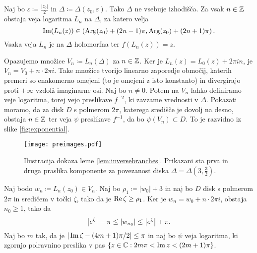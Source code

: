 \begin{dokaz}
    Naj bo \(\varepsilon \coloneq \frac{|z_0|}{2}\) in \(\Delta \coloneq \Delta (z_0, \varepsilon)\). Tako \(\Delta\) ne vsebuje izhodišča. Za vsak \(n \in \mathbb Z\) obstaja veja logaritma \(L_n\) na \(\Delta\), za katero velja
    \[\operatorname{Im} (L_n (z)) \in \left( \operatorname{Arg} (z_0) + (2 n - 1) \pi, \operatorname{Arg} (z_0) + (2 n + 1) \pi \right).\]
    Vsaka veja \(L_n\) je na \(\Delta\) holomorfna ter \(f (L_n (z)) = z\).

    Opazujemo množice \(V_n \coloneq L_n (\Delta)\) za \(n \in \mathbb Z\). Ker je \(L_n (z) = L_0 (z) + 2 \pi i n\), je \(V_n = V_0 + n \cdot 2 \pi i\). Take množice tvorijo linearno zaporedje območij, katerih premeri so enakomerno omejeni (to je omejeni z isto konstanto) in divergirajo proti \(\pm \infty\) vzdolž imaginarne osi. Naj bo \(n \neq 0\). Potem na \(V_n\) lahko definiramo veje logaritma, torej vejo preslikave \(f^{-2}\), ki zavzame vrednosti v \(\Delta\). Pokazati moramo, da za disk \(D\) s polmerom \(2 \pi\), katerega središče je dovolj na desno, obstaja \(n \in \mathbb Z\) ter veja \(\psi\) preslikave \(f^{- 1}\), da bo \(\psi (V_n) \subset D\). To je razvidno iz slike \ref{fig:exponential}.
    \begin{figure}
        \centering
        \texttt{[image: preimages.pdf]}
        \caption[]{Ilustracija dokaza leme \ref{lem:inversebranches}. Prikazani sta prva in druga praslika komponente za povezanost diska \(\Delta = \Delta (3, \frac{3}{2})\).}
        \label{fig:preimages}
    \end{figure}

    Naj bodo \(w_n \coloneq L_n (z_0) \in V_n\). Naj bo \(\rho_1 \coloneq |w_0| + 3\) in naj bo \(D\) disk s polmerom \(2 \pi\) in sredičem v točki \(\zeta\), tako da je \(\operatorname{Re} \zeta \geq \rho_1\). Ker je \(w_n = w_0 + n \cdot 2 \pi i\), obstaja \(n_0 \geq 1\), tako da
    \begin{equation} \label{eqn:zest}
        \left\lvert e^{\zeta}\right\rvert - \pi \leq \left\lvert w_{n_0}\right\rvert \leq \left\lvert e^{\zeta}\right\rvert + \pi.
    \end{equation}
    Naj bo \(m\) tak, da je \(|\operatorname{Im} \zeta - (4 m + 1) \pi / 2| \leq \pi\) in naj bo \(\psi\) veja logaritma, ki zgornjo polravnino preslika v pas \(\left\{ z \in \mathbb C : 2 m \pi < \operatorname{Im} z < (2 m + 1) \pi \right\}\).


\end{dokaz}
